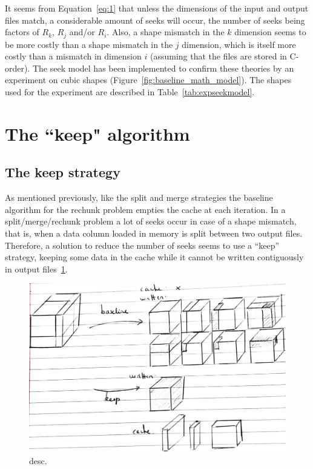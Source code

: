 \documentclass[conference]{IEEEtran}
\begin{document}
It seems from Equation~\ref{eq:1} that unless the dimensions of the input and
output files match, a considerable amount of seeks will occur, the number of
seeks being factors of $R_k$, $R_j$ and/or $R_i$. Also, a shape mismatch in the
$k$ dimension seems to be more costly than a shape mismatch in the $j$ dimension,
which is itself more costly than a mismatch in dimension $i$ (assuming that the
files are stored in C-order). The seek model has been implemented to confirm
these theories by an experiment on cubic shapes
(Figure~\ref{fig:baseline_math_model}). The shapes used for the experiment are
described in Table~\ref{tab:expseekmodel}.

\section{The ``keep" algorithm}

\subsection{The keep strategy}

As mentioned previously, like the split and merge strategies the baseline
algorithm for the rechunk problem empties the cache at each iteration. In a
split/merge/rechunk problem a lot of seeks occur in case of a shape mismatch,
that is, when a data column loaded in memory is split between two output files.
Therefore, a solution to reduce the number of seeks seems to use a ``keep''
strategy, keeping some data in the cache while it cannot be written contiguously
in output files~\ref{fig:keepvsbaseline}.

\begin{figure}[h]
\centering
\includegraphics[scale=0.25]{./figures/new/naive_vs_keep.jpeg}
\caption{desc.}
\label{fig:keepvsbaseline}
\end{figure}
\end{document}

